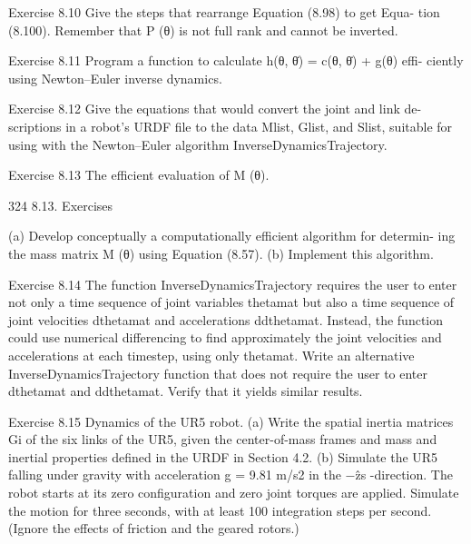 \documentclass[12pt,a4paper]{article}
\begin{document}
Exercise 8.10 Give the steps that rearrange Equation (8.98) to get Equa-
tion (8.100). Remember that P (θ) is not full rank and cannot be inverted.

Exercise 8.11 Program a function to calculate h(θ, θ̇) = c(θ, θ̇) + g(θ) effi-
ciently using Newton–Euler inverse dynamics.

Exercise 8.12 Give the equations that would convert the joint and link de-
scriptions in a robot’s URDF file to the data Mlist, Glist, and Slist, suitable
for using with the Newton–Euler algorithm InverseDynamicsTrajectory.

Exercise 8.13 The efficient evaluation of M (θ).


324                                                                                  8.13. Exercises

  (a) Develop conceptually a computationally efficient algorithm for determin-
      ing the mass matrix M (θ) using Equation (8.57).
  (b) Implement this algorithm.

Exercise 8.14 The function InverseDynamicsTrajectory requires the user
to enter not only a time sequence of joint variables thetamat but also a time
sequence of joint velocities dthetamat and accelerations ddthetamat. Instead,
the function could use numerical differencing to find approximately the joint
velocities and accelerations at each timestep, using only thetamat. Write an
alternative InverseDynamicsTrajectory function that does not require the
user to enter dthetamat and ddthetamat. Verify that it yields similar results.

Exercise 8.15 Dynamics of the UR5 robot.
 (a) Write the spatial inertia matrices Gi of the six links of the UR5, given
     the center-of-mass frames and mass and inertial properties defined in the
     URDF in Section 4.2.
 (b) Simulate the UR5 falling under gravity with acceleration g = 9.81 m/s2
     in the −ẑs -direction. The robot starts at its zero configuration and zero
     joint torques are applied. Simulate the motion for three seconds, with at
     least 100 integration steps per second. (Ignore the effects of friction and
     the geared rotors.)
\end{document}
